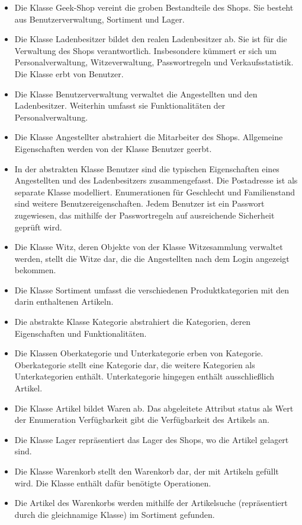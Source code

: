 \documentclass[pdftex,12pt,a4paper]{article}
\begin{document}
\begin{itemize}
\item Die Klasse Geek-Shop vereint die groben Bestandteile des Shops. Sie besteht aus Benutzerverwaltung, Sortiment und Lager.
\item Die Klasse Ladenbesitzer bildet den realen Ladenbesitzer ab. Sie ist für die Verwaltung des Shops verantwortlich. Insbesondere kümmert er sich um Personalverwaltung, Witzeverwaltung, Passwortregeln und Verkaufsstatistik. Die Klasse erbt von Benutzer.
\item Die Klasse Benutzerverwaltung verwaltet die Angestellten und den Ladenbesitzer. Weiterhin umfasst sie Funktionalit\"aten der Personalverwaltung.
\item Die Klasse Angestellter abstrahiert die Mitarbeiter des Shops. Allgemeine Eigenschaften werden von der Klasse Benutzer geerbt.
\item In der abstrakten Klasse Benutzer sind die typischen Eigenschaften eines Angestellten und des Ladenbesitzers zusammengefasst. Die Postadresse ist als separate Klasse modelliert. Enumerationen f\"ur Geschlecht und Familienstand sind weitere Benutzereigenschaften. Jedem Benutzer ist ein Passwort zugewiesen, das mithilfe der Passwortregeln auf ausreichende Sicherheit gepr\"uft wird.
\item Die Klasse Witz, deren Objekte von der Klasse Witzesammlung verwaltet werden, stellt die Witze dar, die die Angestellten nach dem Login angezeigt bekommen.
\item Die Klasse Sortiment umfasst die verschiedenen Produktkategorien mit den darin enthaltenen Artikeln.
\item Die abstrakte Klasse Kategorie abstrahiert die Kategorien, deren Eigenschaften und Funktionalitäten.
\item Die Klassen Oberkategorie und Unterkategorie erben von Kategorie. Oberkategorie stellt eine Kategorie dar, die weitere Kategorien als Unterkategorien enthält. Unterkategorie hingegen enthält ausschließlich Artikel.
\item Die Klasse Artikel bildet Waren ab. Das abgeleitete Attribut status als Wert der Enumeration Verfügbarkeit gibt die Verfügbarkeit des Artikels an.
\item Die Klasse Lager repräsentiert das Lager des Shops, wo die Artikel gelagert sind.
\item Die Klasse Warenkorb stellt den Warenkorb dar, der mit Artikeln gefüllt wird. Die Klasse enthält dafür benötigte Operationen.
\item Die Artikel des Warenkorbs werden mithilfe der Artikelsuche (repräsentiert durch die gleichnamige Klasse) im Sortiment gefunden.

\end{itemize}
\end{document}
